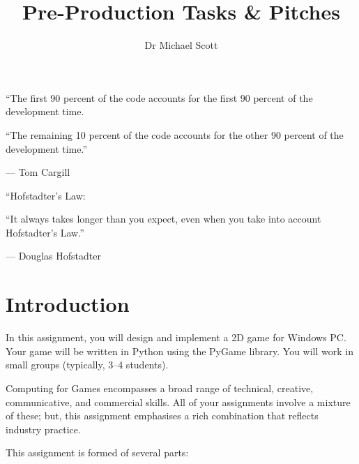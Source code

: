 \documentclass{../fal_assignment}
\title{Pre-Production Tasks \& Pitches}
\author{Dr Michael Scott}
\begin{document}
\maketitle

\begin{marginquote}
    ``The first 90 percent of the code accounts for the first 90 percent of the development time.
    
    ``The remaining 10 percent of the code accounts for the other 90 percent of the development time.''
    
    --- Tom Cargill
    
    \marginquoterule
    
    ``Hofstadter's Law:
    
    ``It always takes longer than you expect, even when you take into account Hofstadter's Law.''
    
    --- Douglas Hofstadter
\end{marginquote}

\section*{Introduction}

In this assignment, you will design and implement a 2D game for Windows PC. Your game will be written in Python using the PyGame library. You will work in small groups (typically, 3--4 students).

Computing for Games encompasses a broad range of technical, creative, communicative, and commercial skills. All of your assignments involve a mixture of these; but, this assignment emphasises a rich combination that reflects industry practice.

This assignment is formed of several parts:
\end{document}

